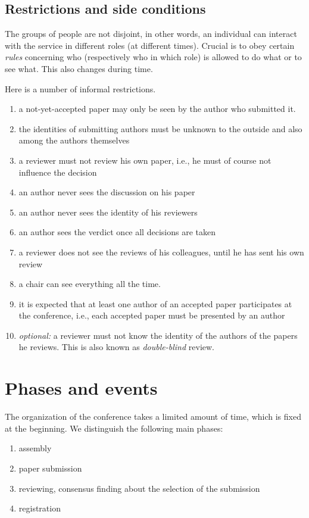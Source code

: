 \subsection{Restrictions and side conditions}
\label{sec:restrictions}


The groups of people are not disjoint, in other words, an individual can
interact with the service in different roles (at different times).  Crucial
is to obey certain \emph{rules} concerning who (respectively who in which
role) is allowed to do what or to see what. This also changes during time.

Here is a number of informal restrictions.

\begin{enumerate}
\item a not-yet-accepted paper may only be seen by the author who submitted
  it.
\item the identities of submitting authors must be unknown to the outside
  and also among the authors themselves
\item a reviewer must not review his own paper, i.e., he must of course not
  influence the decision
\item an author never sees the discussion on his paper
\item an author never sees the identity of his reviewers
\item an author sees the verdict once all decisions are taken
\item a reviewer does not see the reviews of his colleagues, until he has
  sent his own review
\item a chair can see everything all the time.
\item it is expected that at least one author of an accepted paper
  participates at the conference, i.e., each accepted paper must be
  presented by an author
\item \emph{optional:} a reviewer must not know the identity of the authors
  of the papers he reviews. This is also known as \emph{double-blind}
  review.
\end{enumerate}







\section{Phases and events}
\label{sec:phases}%

The organization of the conference takes a limited amount of time, which is
fixed at the beginning. We distinguish the following main phases:
\begin{enumerate}
\item assembly
\item paper submission
\item reviewing, consensus finding about the selection of the submission
\item registration
\end{enumerate}

